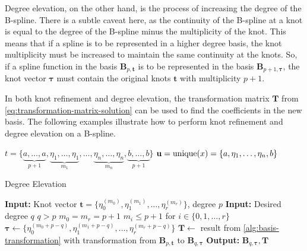 Degree elevation, on the other hand, is the process of increasing the degree of the B-spline. There is a subtle caveat here, as the continuity of the B-spline at a knot is equal to the degree of the B-spline minus the multiplicity of the knot. This means that if a spline is to be represented in a higher degree basis, the knot multiplicity must be increased to maintain the same continuity at the knots. So, if a spline function in the basis $\mathbf B_{p,\mathbf t}$ is to be represented in the basis $\mathbf B_{p+1,\boldsymbol \tau}$, the knot vector $\boldsymbol \tau$ must contain the original knots $\mathbf t$ with multiplicity $p+1$.

In both knot refinement and degree elevation, the transformation matrix $\mathbf T$ from \cref{eq:transformation-matrix-solution} can be used to find the coefficients in the new basis. The following examples illustrate how to perform knot refinement and degree elevation on a B-spline.

$t = \{\underbrace{a, \dots, a}_{p+1}, \underbrace{\eta_1, \dots, \eta_1}_{m_1}, \dots, \underbrace{\eta_{n}, \dots, \eta_{n}}_{m_n}, \underbrace{b, \dots, b}_{p+1}\}$
$\mathbf u = \operatorname{unique}(x) = \{a, \eta_1, \dots, \eta_n, b\}$

\begin{algorithm}
    \caption{Degree Elevation}\label{alg:degree-elevation}
    \begin{algorithmic}[1]
        \State \textbf{Input:} Knot vector $\mathbf t = \{\eta_0^{(m_0)}, \eta_1^{(m_1)}, \dots, \eta_r^{(m_r)}\}$, degree $p$
        \State \textbf{Input:} Desired degree $q$
        \Ensure $q > p$
        \Ensure $m_0 = m_r = p+1$
        \Ensure $m_i \leq p+1$ for $i \in \{0,1,\ldots,r\}$
        \State $\boldsymbol\tau \gets \{\eta_0^{(m_0+p-q)}, \eta_1^{(m_1+p-q)}, \dots, \eta_r^{(m_r+p-q)}\}$
        \State $\mathbf T \gets $ result from \cref{alg:basis-transformation} with transformation from $\mathbf B_{p,\mathbf t}$ to $\mathbf B_{q,\boldsymbol \tau}$
        \State \textbf{Output:} $\mathbf B_{q, \boldsymbol \tau}, \mathbf T$
    \end{algorithmic}
\end{algorithm}

